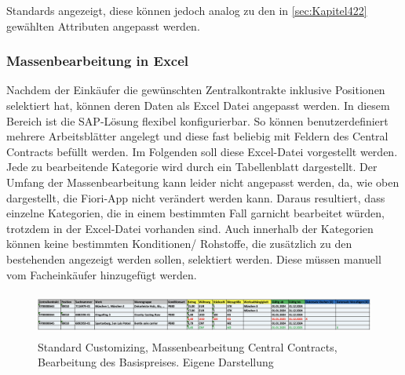 Standards angezeigt, diese können jedoch analog zu den in \ref{sec:Kapitel422} gewählten Attributen angepasst werden.

\subsubsection{Massenbearbeitung in Excel}

Nachdem der Einkäufer die gewünschten Zentralkontrakte inklusive Positionen selektiert hat, können deren Daten als Excel Datei angepasst werden. In diesem Bereich ist die SAP-Lösung flexibel konfigurierbar. So können benutzerdefiniert mehrere Arbeitsblätter angelegt und diese fast beliebig mit Feldern des Central Contracts befüllt werden. Im Folgenden soll diese Excel-Datei vorgestellt werden. Jede zu bearbeitende Kategorie wird durch ein Tabellenblatt dargestellt. Der Umfang der Massenbearbeitung kann leider nicht angepasst werden, da, wie oben dargestellt, die Fiori-App nicht verändert werden kann. Daraus resultiert, dass \zB einzelne Kategorien, die in einem bestimmten Fall garnicht bearbeitet würden, trotzdem in der Excel-Datei vorhanden sind. Auch innerhalb der Kategorien können keine bestimmten Konditionen/ Rohstoffe, die zusätzlich zu den bestehenden angezeigt werden sollen, selektiert werden. Diese müssen manuell vom Facheinkäufer hinzugefügt werden. 

\begin{figure}[H]
    \centering
    \includegraphics[height=1.43cm]{Bilder/Praxisteil-S-Schritt-2.png}
    \caption[Standard Customizing, Massenbearbeitung Central Contracts, Bearbeitung des Basispreises]{Standard Customizing, Massenbearbeitung Central Contracts, Bearbeitung des Basispreises. Eigene Darstellung}
    \label{fig:PraxisSSchritt2}
\end{figure}


